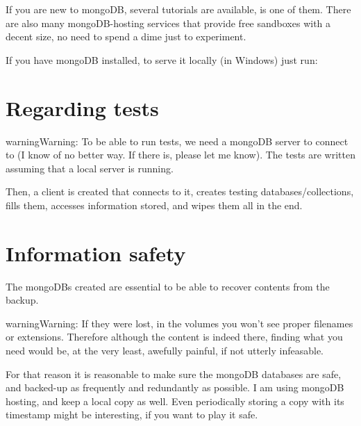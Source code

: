 \documentclass[letterpaper,10pt,english]{sphinxmanual}
\begin{document}
If you are new to mongoDB, several tutorials are available,  is one of them. There are also many mongoDB-hosting services that provide free sandboxes with a decent size, no need to spend a dime just to experiment.

If you have mongoDB installed, to serve it locally (in Windows) just run:

\begin{sphinxVerbatim}[commandchars=\\\{\}]
 
\end{sphinxVerbatim}


\section{Regarding tests}
\label{\detokenize{index:regarding-tests}}
\begin{sphinxadmonition}{warning}{Warning:}
To be able to run tests, we need a mongoDB server to connect to (I know of no better way. If there is, please let me know). The tests are written assuming that a local server is running.
\end{sphinxadmonition}

Then, a client is created that connects to it, creates testing databases/collections, fills them, accesses information stored, and wipes them all in the end.


\section{Information safety}
\label{\detokenize{index:information-safety}}
The mongoDBs created are essential to be able to recover contents from the backup.

\begin{sphinxadmonition}{warning}{Warning:}
If they were lost, in the volumes you won't see proper filenames or extensions. Therefore although the content is indeed there, finding what you need would be, at the very least, awefully painful, if not utterly infeasable.
\end{sphinxadmonition}

For that reason it is reasonable to make sure the mongoDB databases are safe,
and backed-up as frequently and redundantly as possible. I am using mongoDB hosting, and keep a local copy as well. Even periodically storing a copy with its
timestamp might be interesting, if you want to play it safe.
\end{document}
